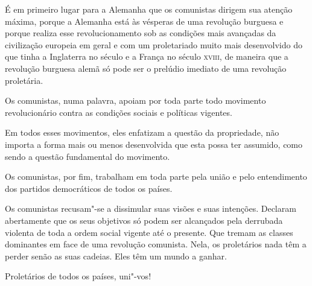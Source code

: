 É em primeiro lugar para a Alemanha que os comunistas dirigem sua
atenção máxima, porque a Alemanha está às vésperas de uma revolução
burguesa e porque realiza esse revolucionamento sob as condições mais
avançadas da civilização europeia em geral e com um proletariado muito
mais desenvolvido do que tinha a Inglaterra no século  e a França
no século \textsc{xviii}, de maneira que a revolução burguesa alemã só pode
ser o prelúdio imediato de uma revolução proletária.

Os comunistas, numa palavra, apoiam por toda parte todo movimento
revolucionário contra as condições sociais e políticas vigentes.

Em todos esses movimentos, eles enfatizam a questão da propriedade, não
importa a forma mais ou menos desenvolvida que esta possa ter assumido,
como sendo a questão fundamental do movimento.

Os comunistas, por fim, trabalham em toda parte pela união e pelo
entendimento dos partidos democráticos de todos os países.

Os comunistas recusam"-se a dissimular suas visões e suas intenções.
Declaram abertamente que os seus objetivos só podem ser alcançados pela
derrubada violenta de toda a ordem social vigente até o presente. Que
tremam as classes dominantes em face de uma revolução comunista. Nela,
os proletários nada têm a perder senão as suas cadeias. Eles têm um
mundo a ganhar.

Proletários de todos os países, uni"-vos!



